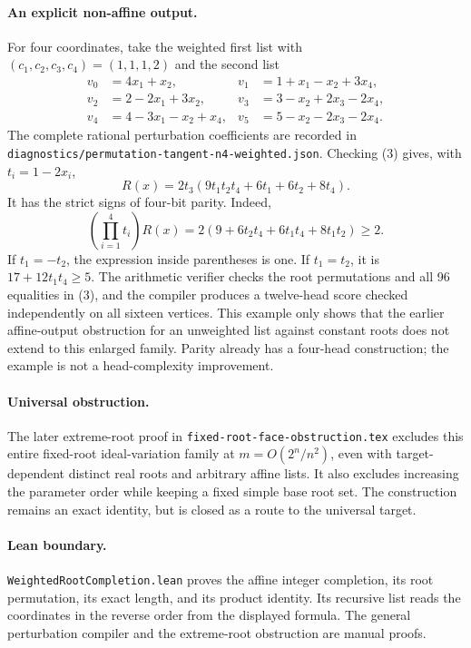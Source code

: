 \documentclass[11pt]{article}
\begin{document}
\paragraph{An explicit non-affine output.}
For four coordinates, take the weighted first list with
$(c_1,c_2,c_3,c_4)=(1,1,1,2)$ and the second list
\[
 \begin{aligned}
 v_0&=4x_1+x_2,&v_1&=1+x_1-x_2+3x_4,\\
 v_2&=2-2x_1+3x_2,&v_3&=3-x_2+2x_3-2x_4,\\
 v_4&=4-3x_1-x_2+x_4,&v_5&=5-x_2-2x_3-2x_4.
 \end{aligned}
\]
The complete rational perturbation coefficients are recorded in
\texttt{diagnostics/permutation-tangent-n4-weighted.json}.
Checking (3) gives, with $t_i=1-2x_i$,
\[
 R(x)=2t_3(9t_1t_2t_4+6t_1+6t_2+8t_4).
\]
It has the strict signs of four-bit parity. Indeed,
\[
 \left(\prod_{i=1}^4t_i\right)R(x)
       =2(9+6t_2t_4+6t_1t_4+8t_1t_2)\ge2.
\]
If $t_1=-t_2$, the expression inside parentheses is one.
If $t_1=t_2$, it is $17+12t_1t_4\ge5$.
The arithmetic verifier checks the root permutations and all 96
equalities in (3), and the compiler produces a twelve-head score
checked independently on all sixteen vertices.
This example only shows that the earlier affine-output obstruction
for an unweighted list against constant roots does not extend to
this enlarged family. Parity already has a four-head construction;
the example is not a head-complexity improvement.

\paragraph{Universal obstruction.}
The later extreme-root proof in
\texttt{fixed-root-face-obstruction.tex} excludes this entire
fixed-root ideal-variation family at $m=O(2^n/n^2)$, even with
target-dependent distinct real roots and arbitrary affine lists.
It also excludes increasing the parameter order while keeping a
fixed simple base root set. The construction remains an exact
identity, but is closed as a route to the universal target.

\paragraph{Lean boundary.}
\texttt{WeightedRootCompletion.lean} proves the affine integer
completion, its root permutation, its exact length, and its product
identity. Its recursive list reads the coordinates in the reverse
order from the displayed formula. The general perturbation compiler
and the extreme-root obstruction are manual proofs.
\end{document}

